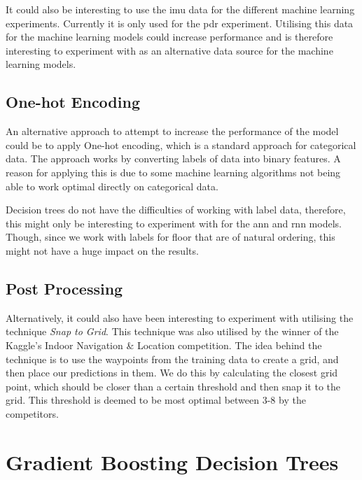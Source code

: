 It could also be interesting to use the \gls{imu} data for the different machine learning experiments. Currently it is only used for the \gls{pdr} experiment. Utilising this data for the machine learning models could increase performance and is therefore interesting to experiment with as an alternative data source for the machine learning models.

\subsection{One-hot Encoding}
An alternative approach to attempt to increase the performance of the model could be to apply One-hot encoding, which is a standard approach for categorical data. The approach works by converting labels of data into binary features. A reason for applying this is due to some machine learning algorithms not being able to work optimal directly on categorical data.

Decision trees do not have the difficulties of working with label data, therefore, this might only be interesting to experiment with for the \gls{ann} and \gls{rnn} models. Though, since we work with labels for floor that are of natural ordering, this might not have a huge impact on the results.

\subsection{Post Processing}
Alternatively, it could also have been interesting to experiment with utilising the technique \textit{Snap to Grid}. This technique was also utilised by the winner of the Kaggle's Indoor Navigation \& Location competition. The idea behind the technique is to use the waypoints from the training data to create a grid, and then place our predictions in them. We do this by calculating the closest grid point, which should be closer than a certain threshold and then snap it to the grid. This threshold is deemed to be most optimal between 3-8 by the competitors.


\section{Gradient Boosting Decision Trees}

